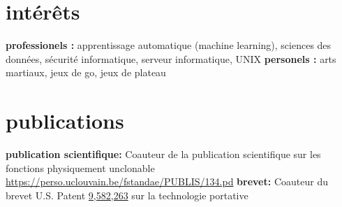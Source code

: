 \documentclass[]{friggeri-cv} %
\begin{document}
\section{intérêts}

\textbf{professionels :} apprentissage automatique (machine learning), sciences
des données, sécurité informatique, serveur informatique, UNIX
\medbreak
\textbf{personels :} arts martiaux, jeux de go, jeux de plateau


\section{publications}

\textbf{publication scientifique:} Coauteur de la publication scientifique sur
les fonctions physiquement unclonable
\href{https://perso.uclouvain.be/fstandae/PUBLIS/134.pd}{https://perso.uclouvain.be/fstandae/PUBLIS/134.pd}
\medbreak
\textbf{brevet:} Coauteur du brevet U.S. Patent
\href{http://patft.uspto.gov/netacgi/nph-Parser?Sect2=PTO1&Sect2=HITOFF&p=1&u=/netahtml/PTO/search-bool.html&r=1&f=G&l=50&d=PALL&RefSrch=yes&Query=PN/9582263}{9,582,263} sur la technologie portative

\end{document}
